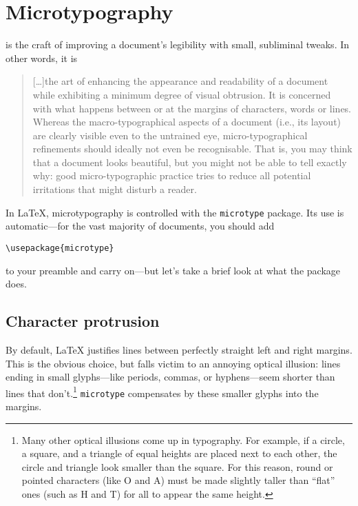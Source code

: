 \chapter{Microtypography}
\label{microtype}

 is the craft of improving a document's legibility
with small, subliminal tweaks.
In other words, it is
\begin{quote}
[\dots]the art of enhancing the appearance and readability of a
document while exhibiting a minimum degree of visual obtrusion.
It is concerned with what happens between or at the margins of characters,
words or lines. Whereas the macro-typographical aspects of a document
(i.e., its layout) are clearly visible even to the untrained eye,
micro-typographical refinements should ideally not even be recognisable.
That is, you may think that a document looks beautiful, but you
might not be able to tell exactly why: good micro-typographic practice tries to
reduce all potential irritations that might disturb a reader.\punckern{}
\end{quote}

In \LaTeX{}, microtypography is controlled with the
\texttt{microtype} package.
Its use is automatic---for the vast majority of documents, you should add
\begin{leftfigure}
\begin{lstlisting}
\usepackage{microtype}
\end{lstlisting}
\end{leftfigure}
to your preamble and carry on---but let's take a brief look at what the package
does.

\section{Character protrusion}

By default, \LaTeX{} justifies lines between perfectly straight
left and right margins.
This is the obvious choice,
but falls victim to an annoying optical illusion:
lines ending in small glyphs---like periods, commas,
or hyphens---seem shorter than lines that
don't.\punckern\footnote{Many other optical illusions come up in typography.
For example, if a circle, a square, and a triangle
of equal heights are placed next to each other,
the circle and triangle look smaller than the square.
For this reason, round or pointed characters (like O and A) must
be made slightly taller than ``flat'' ones (such as H and T) for all
to appear the same height.\punckern{}}
\texttt{microtype} compensates by  these smaller glyphs
into the margins.


